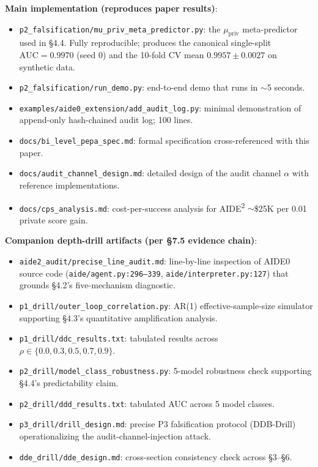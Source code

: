 \textbf{Main implementation (reproduces paper results)}:
\begin{itemize}
    \item \texttt{p2\_falsification/mu\_priv\_meta\_predictor.py}: the $\mu_{\text{priv}}$ meta-predictor used in \S4.4. Fully reproducible; produces the canonical single-split $\text{AUC}=0.9970$ (seed 0) and the 10-fold CV mean $0.9957\pm0.0027$ on synthetic data.
    \item \texttt{p2\_falsification/run\_demo.py}: end-to-end demo that runs in $\sim$5 seconds.
    \item \texttt{examples/aide0\_extension/add\_audit\_log.py}: minimal demonstration of append-only hash-chained audit log; 100 lines.
    \item \texttt{docs/bi\_level\_pepa\_spec.md}: formal specification cross-referenced with this paper.
    \item \texttt{docs/audit\_channel\_design.md}: detailed design of the audit channel $\alpha$ with reference implementations.
    \item \texttt{docs/cps\_analysis.md}: cost-per-success analysis for AIDE\textsuperscript{2} $\sim$\$25K per 0.01 private score gain.
\end{itemize}

\textbf{Companion depth-drill artifacts (per \S7.5 evidence chain)}:
\begin{itemize}
    \item \texttt{aide2\_audit/precise\_line\_audit.md}: line-by-line inspection of AIDE0 source code (\texttt{aide/agent.py:296--339}, \texttt{aide/interpreter.py:127}) that grounds \S4.2's five-mechanism diagnostic.
    \item \texttt{p1\_drill/outer\_loop\_correlation.py}: AR(1) effective-sample-size simulator supporting \S4.3's quantitative amplification analysis.
    \item \texttt{p1\_drill/ddc\_results.txt}: tabulated results across $\rho \in \{0.0, 0.3, 0.5, 0.7, 0.9\}$.
    \item \texttt{p2\_drill/model\_class\_robustness.py}: 5-model robustness check supporting \S4.4's predictability claim.
    \item \texttt{p2\_drill/ddd\_results.txt}: tabulated AUC across 5 model classes.
    \item \texttt{p3\_drill/drill\_design.md}: precise P3 falsification protocol (DDB-Drill) operationalizing the audit-channel-injection attack.
    \item \texttt{dde\_drill/dde\_design.md}: cross-section consistency check across \S3--\S6.
\end{itemize}

